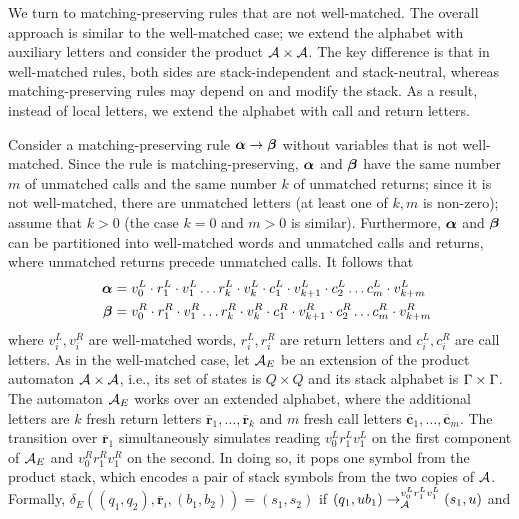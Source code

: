 We turn to matching-preserving rules that are not well-matched.
The overall approach is similar to the well-matched case; we extend the alphabet with auxiliary letters and consider the product $\mathcal{A} \times \mathcal{A}$.
The key difference is that in well-matched rules, both sides are stack-independent and stack-neutral, whereas matching-preserving rules may depend on and modify the stack.
As a result, instead of local letters, we extend the alphabet with call and return letters. 

\newcommand{\autExt}{\aut_E}
\newcommand{\return}{\overline{\mathbf{r}}}
\newcommand{\call}{\overline{\mathbf{c}}}
Consider a matching-preserving rule $\boldsymbol{\alpha} \to \boldsymbol{\beta}$ without variables that is not well-matched.
Since the rule is matching-preserving, $\boldsymbol{\alpha}$ and $\boldsymbol{\beta}$ have the same number $m$ of unmatched calls and the same number $k$ of unmatched returns; 
since it is not well-matched, there are unmatched letters (at least one of $k, m$ is non-zero); assume that $k>0$ (the case $k=0$ and $m>0$ is similar). 
Furthermore,  $\boldsymbol{\alpha}$ and $\boldsymbol{\beta}$ can be partitioned into well-matched words and unmatched calls and returns, where
unmatched returns precede unmatched calls.
It follows that  
\begin{align*}
&&\boldsymbol{\alpha} &= v_0^L \cdot r_1^L \cdot v_1^L \ldots r_k^L \cdot v_k^L \cdot c_1^L \cdot v_{k+1}^L \cdot c_2^L \ldots c_m^L \cdot v_{k+m}^L \\
&&\boldsymbol{\beta} &= v_0^R \cdot r_1^R \cdot v_1^R \ldots r_k^R \cdot v_k^R \cdot c_1^R \cdot v_{k+1}^R \cdot c_2^R \ldots c_m^R \cdot v_{k+m}^R
\end{align*}
where $v_i^L, v_i^R$ are well-matched words, $r_i^L, r_i^R$ are return letters and $c_i^L,c_i^R$ are call letters. 
As in the well-matched case, let $\autExt$ be an extension of the product automaton $\mathcal{A} \times \mathcal{A}$, i.e., 
its set of states is $Q \times Q$ and its stack alphabet is $\Gamma \times \Gamma$.
The automaton $\autExt$ works over an extended alphabet, where 
the additional letters are $k$ fresh return letters
$\return_1, \ldots, \return_k$
and $m$ fresh call letters $\call_1, \ldots, \call_m$. 
The transition over $\return_1$ simultaneously  simulates reading $v_0^L r_1^L v_1^L$  on the first component of $\autExt$ and $v_0^R r_1^R v_1^R$ on the second.
In doing so, it pops one symbol from the product stack, which encodes a pair of stack symbols from the two copies of $\mathcal{A}$.
Formally, $\delta_E((q_1, q_2),\return_i, (b_1, b_2)) = (s_1, s_2)$ if $(q_1,u b_1) \rightarrow_{\mathcal{A}}^{v_0^L r_1^L v_1^L} (s_1, u)$ and 
